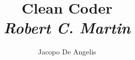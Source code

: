 \documentclass[11pt,a4paper]{book}
\begin{document}
\title{Clean Coder\\
\large{\textit{Robert C. Martin}}}
\author{Jacopo De Angelis}
\maketitle

\pagebreak
\tableofcontents
\pagebreak
\end{document}

